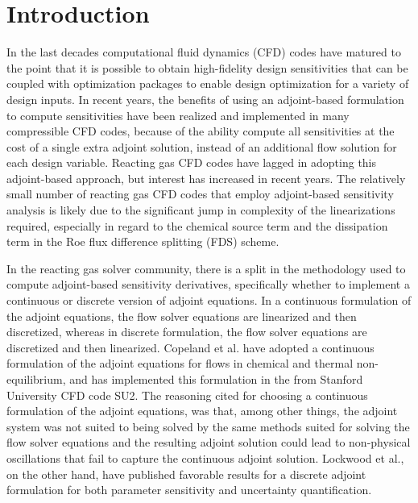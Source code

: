 \chapter{Introduction}
\label{chapter-one}

In the last decades computational fluid dynamics (CFD) codes have matured to the
point that it is possible to obtain high-fidelity design sensitivities that can
be coupled with optimization packages to enable design optimization for a
variety of design inputs\cite{baysal1992aerodynamic, balagangadhar2001design}.
In recent years, the benefits of using an adjoint-based formulation to compute
sensitivities have been realized and implemented in many compressible CFD
codes\cite{mavriplis-2006, nemec-aftosmis-adjoint, nielsen2002recent}, because
of the ability compute all sensitivities at the cost of a single extra adjoint
solution, instead of an additional flow solution for each design variable.
Reacting gas CFD codes have lagged in adopting this adjoint-based
approach, but interest has increased in recent years\cite{Copeland, Barcelona,
lockwood2010parameter}.  The relatively small number of reacting gas CFD codes
that employ adjoint-based sensitivity analysis is likely due to the significant
jump in complexity of the linearizations required, especially in regard to the
chemical source term and the dissipation term in the Roe flux difference
splitting (FDS) scheme\cite{roe}.

In the reacting gas solver community, there is a split in the methodology used
to compute adjoint-based sensitivity derivatives, specifically whether to
implement a continuous or discrete version of adjoint equations.  In a
continuous formulation of the adjoint equations, the flow solver equations are
linearized and then discretized, whereas in discrete formulation, the flow
solver equations are discretized and then linearized.  Copeland et
al.\cite{Copeland} have adopted a continuous formulation of the adjoint equations
for flows in chemical and thermal non-equilibrium, and has implemented this
formulation in the from Stanford University CFD code
SU2\cite{palacios2013stanford}.  The reasoning cited for choosing a continuous
formulation of the adjoint equations, was that, among other things, the adjoint
system was not suited to being solved by the same methods suited for solving the
flow solver equations and the resulting adjoint solution could lead to
non-physical oscillations that fail to capture the continuous adjoint solution.
Lockwood et al.\cite{lockwood2010uncertainty, lockwood2010parameter}, on the
other hand, have published favorable results for a discrete adjoint formulation
for both parameter sensitivity and uncertainty quantification.

